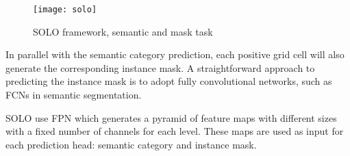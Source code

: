 \begin{figure}[ht]
    \centering
    \texttt{[image: solo]}
    \caption{SOLO framework, semantic and mask task}
\end{figure}

In parallel with the semantic category prediction, each positive grid cell will also generate the corresponding instance mask. A straightforward approach to
predicting the instance mask is to adopt fully convolutional networks, such as FCNs in semantic segmentation.

SOLO use FPN which generates a pyramid of feature maps with different sizes with a fixed number of channels for each level. These maps are used as input for each prediction
head: semantic category and instance mask.










